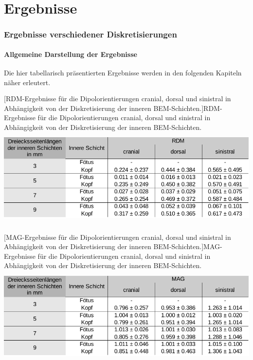 \chapter{Ergebnisse}
\subsection{Ergebnisse verschiedener Diskretisierungen }
\subsubsection{Allgemeine Darstellung der Ergebnisse}
Die hier tabellarisch präsentierten Ergebnisse werden in den folgenden
Kapiteln näher erleutert.



\begin{center}
\begin{minipage}{17cm}
[RDM{}-Ergebnisse für die Dipolorientierungen cranial,
dorsal und sinistral in Abhängigkeit von der Diskretisierung der
inneren BEM{}-Schichten.]{RDM-Ergebnisse für die Dipolorientierungen
cranial, dorsal und sinistral in Abhängigkeit von der Diskretisierung
der inneren BEM-Schichten. }
\label{seq:refTable1}\includegraphics[width=15.035cm,height=4.957cm]{BA-img/BA-img14.pdf}\end{minipage}
\end{center}


\begin{center}
\begin{minipage}{17cm}
[MAG{}-Ergebnisse für die Dipolorientierungen cranial,
dorsal und sinistral in Abhängigkeit von der Diskretisierung der
inneren BEM{}-Schichten.]{MAG-Ergebnisse für die Dipolorientierungen
cranial, dorsal und sinistral in Abhängigkeit von der Diskretisierung
der inneren BEM-Schichten. }
\label{seq:refTable2}\includegraphics[width=15.035cm,height=4.957cm]{BA-img/BA-img15.pdf}\end{minipage}
\end{center}


